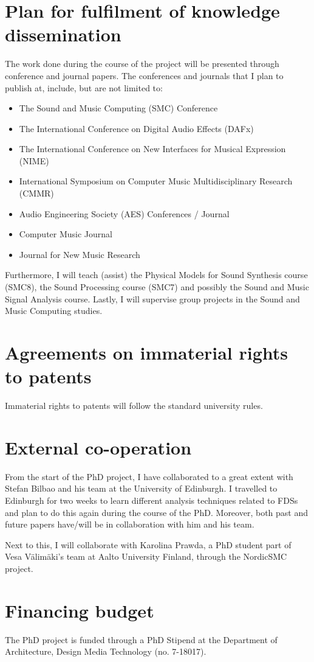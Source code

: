 \section{Plan for fulfilment of knowledge dissemination}
The work done during the course of the project will be presented through conference and journal papers. The conferences and journals that I plan to publish at, include, but are not limited to:
\begin{itemize}
\item The Sound and Music Computing (SMC) Conference
\item The International Conference on Digital Audio Effects (DAFx)
\item The International Conference on New Interfaces for Musical Expression (NIME)
\item International Symposium on Computer Music Multidisciplinary Research (CMMR)
\item Audio Engineering Society (AES) Conferences / Journal
\item Computer Music Journal
\item Journal for New Music Research
\end{itemize}
Furthermore, I will teach (assist) the Physical Models for Sound Synthesis course (SMC8), the Sound Processing course (SMC7) and possibly the Sound and Music Signal Analysis course. Lastly, I will supervise group projects in the Sound and Music Computing studies.

\section{Agreements on immaterial rights to patents}
Immaterial rights to patents will follow the standard university rules.

\section{External co-operation}
From the start of the PhD project,  I have collaborated to a great extent with Stefan Bilbao and his team at the University of Edinburgh. I travelled to Edinburgh for two weeks to learn different analysis techniques related to FDSs and plan to do this again during the course of the PhD. Moreover, both past and future papers have/will be in collaboration with him and his team.

Next to this, I will collaborate with Karolina Prawda, a PhD student part of Vesa V\"alim\"aki's team at Aalto University Finland, through the NordicSMC project.

\section{Financing budget}
The PhD project is funded through a PhD Stipend at the Department of Architecture, Design Media Technology (no. 7-18017).
